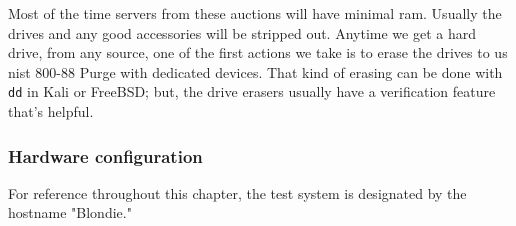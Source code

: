 Most of the time servers from these auctions will have minimal \gls{ram}.  Usually the drives and any good accessories will be stripped out.  Anytime we get a hard drive, from any source, one of the first actions we take is to erase the drives to \gls{us} \gls{nist} 800-88 Purge with dedicated devices.  That kind of erasing can be done with \texttt{dd} in Kali or FreeBSD; but, the drive erasers usually have a verification feature that's helpful.
\subsubsection{Hardware \Gls{configuration}}
For reference throughout this chapter, the test system is designated by the hostname "Blondie."


